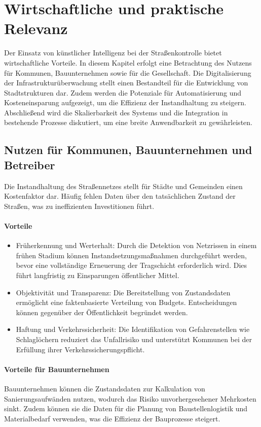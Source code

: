 \section{Wirtschaftliche und praktische Relevanz}
\label{sec:wirtschaftlichkeit}

Der Einsatz von künstlicher Intelligenz bei der Straßenkontrolle bietet wirtschaftliche Vorteile. In diesem Kapitel erfolgt eine Betrachtung des Nutzens für Kommunen, Bauunternehmen sowie für die Gesellschaft. Die Digitalisierung der Infrastrukturüberwachung stellt einen Bestandteil für die Entwicklung von Stadtstrukturen dar. Zudem werden die Potenziale für Automatisierung und Kosteneinsparung aufgezeigt, um die Effizienz der Instandhaltung zu steigern. Abschließend wird die Skalierbarkeit des Systems und die Integration in bestehende Prozesse diskutiert, um eine breite Anwendbarkeit zu gewährleisten.

\subsection{Nutzen für Kommunen, Bauunternehmen und Betreiber}
\label{subsec:nutzen}

Die Instandhaltung des Straßennetzes stellt für Städte und Gemeinden einen Kostenfaktor dar. Häufig fehlen Daten über den tatsächlichen Zustand der Straßen, was zu ineffizienten Investitionen führt.

\paragraph{Vorteile}
\begin{itemize}
    \item Früherkennung und Werterhalt: Durch die Detektion von Netzrissen in einem frühen Stadium können Instandsetzungsmaßnahmen durchgeführt werden, bevor eine vollständige Erneuerung der Tragschicht erforderlich wird. Dies führt langfristig zu Einsparungen öffentlicher Mittel.
    \item Objektivität und Transparenz: Die Bereitstellung von Zustandsdaten ermöglicht eine faktenbasierte Verteilung von Budgets. Entscheidungen können gegenüber der Öffentlichkeit begründet werden.
    \item Haftung und Verkehrssicherheit: Die Identifikation von Gefahrenstellen wie Schlaglöchern reduziert das Unfallrisiko und unterstützt Kommunen bei der Erfüllung ihrer Verkehrssicherungspflicht.
\end{itemize}

\paragraph{Vorteile für Bauunternehmen}
 Bauunternehmen können die Zustandsdaten zur Kalkulation von Sanierungsaufwänden nutzen, wodurch das Risiko unvorhergesehener Mehrkosten sinkt. Zudem können sie die Daten für die Planung von Baustellenlogistik und Materialbedarf verwenden, was die Effizienz der Bauprozesse steigert.

